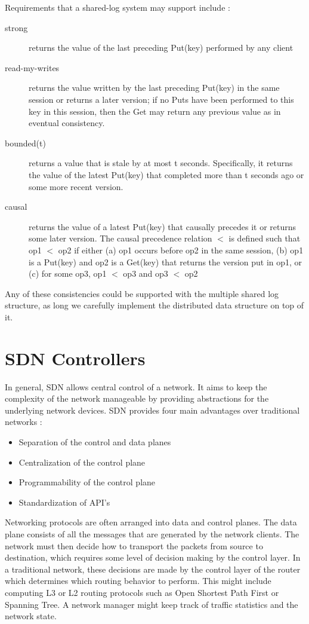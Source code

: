 \documentclass[letterpaper,twocolumn,10pt]{article}
\begin{document}
Requirements that a shared-log system may support include \cite{SLA}:

\begin{description}
\item[strong] returns the value of the last preceding Put(key) performed by any client
\item[read-my-writes] returns the value written by the last preceding Put(key) in the same session or returns a later version; if no Puts have been performed to this key in this session, then the Get may return any previous value as in eventual consistency.
\item[bounded(t)] returns a value that is stale by at most t seconds. Specifically, it returns the value of the latest Put(key) that completed more than t seconds ago or some more recent version.
\item[causal] returns the value of a latest Put(key) that causally precedes it or returns some later version. The causal precedence relation $<$ is defined such that op1 $<$ op2 if either
(a) op1 occurs before op2 in the same session,
(b) op1 is a Put(key) and op2 is a Get(key) that
returns the version put in op1, or
(c) for some op3, op1 $<$ op3 and op3 $<$ op2
\end{description}

Any of these consistencies could be supported with the multiple shared log structure, as long we carefully implement the distributed data structure on top of it.

\section{SDN Controllers}

In general, SDN allows central control of a network. It aims to keep the complexity of the network manageable by providing abstractions for the underlying network devices. SDN provides four main advantages over traditional networks \cite{jain2013network}:

\begin{itemize}
\item Separation of the control and data planes
\item Centralization of the control plane
\item Programmability of the control plane
\item Standardization of API's
\end{itemize}
\cite{SDN}

Networking protocols are often arranged into data and control planes. The data plane consists of all the messages that are generated by the network clients. The network must then decide how to transport the packets from source to destination, which requires some level of decision making by the control layer. In a traditional network, these decisions are made by the control layer of the router which determines which routing behavior to perform. This might include computing L3 or L2
routing protocols such as Open Shortest Path First or Spanning Tree. A network manager might keep track of traffic statistics and the network state.
\end{document}
